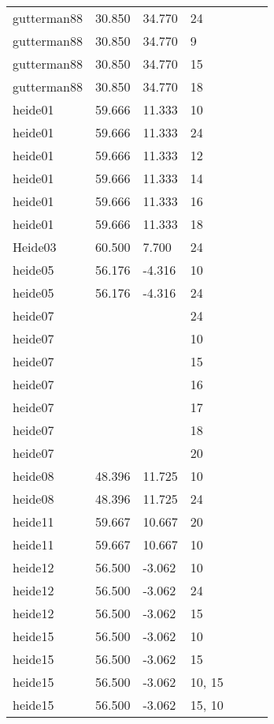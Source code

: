 \documentclass{article}
\begin{document}
\begin{table}[ht]
\begin{tabular}{|p{}|p{}|p{}|p{}|p{}|p{}|p{}|}
  gutterman88 & 30.850 & 34.770 & 24 &  &  &  \\ 
  gutterman88 & 30.850 & 34.770 & 9 &  &  &  \\ 
  gutterman88 & 30.850 & 34.770 & 15 &  &  &  \\ 
  gutterman88 & 30.850 & 34.770 & 18 &  &  &  \\ 
  heide01 & 59.666 & 11.333 & 10 &  &  &  \\ 
  heide01 & 59.666 & 11.333 & 24 &  &  &  \\ 
  heide01 & 59.666 & 11.333 & 12 &  &  &  \\ 
  heide01 & 59.666 & 11.333 & 14 &  &  &  \\ 
  heide01 & 59.666 & 11.333 & 16 &  &  &  \\ 
  heide01 & 59.666 & 11.333 & 18 &  &  &  \\ 
  Heide03 & 60.500 & 7.700 & 24 &  &  &  \\ 
  heide05 & 56.176 & -4.316 & 10 &  &  &  \\ 
  heide05 & 56.176 & -4.316 & 24 &  &  &  \\ 
  heide07 &  &  & 24 &  &  &  \\ 
  heide07 &  &  & 10 &  &  &  \\ 
  heide07 &  &  & 15 &  &  &  \\ 
  heide07 &  &  & 16 &  &  &  \\ 
  heide07 &  &  & 17 &  &  &  \\ 
  heide07 &  &  & 18 &  &  &  \\ 
  heide07 &  &  & 20 &  &  &  \\ 
  heide08 & 48.396 & 11.725 & 10 &  &  &  \\ 
  heide08 & 48.396 & 11.725 & 24 &  &  &  \\ 
  heide11 & 59.667 & 10.667 & 20 &  &  &  \\ 
  heide11 & 59.667 & 10.667 & 10 &  &  &  \\ 
  heide12 & 56.500 & -3.062 & 10 &  &  &  \\ 
  heide12 & 56.500 & -3.062 & 24 &  &  &  \\ 
  heide12 & 56.500 & -3.062 & 15 &  &  &  \\ 
  heide15 & 56.500 & -3.062 & 10 &  &  &  \\ 
  heide15 & 56.500 & -3.062 & 15 &  &  &  \\ 
  heide15 & 56.500 & -3.062 & 10, 15 &  &  &  \\ 
  heide15 & 56.500 & -3.062 & 15, 10 &  &  &  \\ 

\end{tabular}
\end{table}
\end{document}
